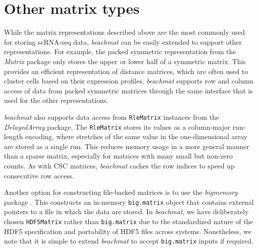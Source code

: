 \documentclass{article}
\newcommand{\beachmat}{\textit{beachmat}}
\newcommand{\code}[1]{\texttt{#1}}
\begin{document}
\section{Other matrix types}
While the matrix representations described above are the most commonly used for storing scRNA-seq data, \beachmat{} can be easily extended to support other representations.
For example, the packed symmetric representation from the \textit{Matrix} package only stores the upper or lower half of a symmetric matrix.
This provides an efficient representation of distance matrices, which are often used to cluster cells based on their expression profiles.
\beachmat{} supports row and column access of data from packed symmetric matrices through the same interface that is used for the other representations.

\beachmat{} also supports data access from \code{RleMatrix} instances from the \textit{DelayedArray} package.
The \code{RleMatrix} stores its values as a column-major run-length encoding, where stretches of the same value in the one-dimensional array are stored as a single run.
This reduces memory usage in a more general manner than a sparse matrix, especially for matrices with many small but non-zero counts.
As with CSC matrices, \beachmat{} caches the row indices to speed up consecutive row access.

Another option for constructing file-backed matrices is to use the \textit{bigmemory} package \cite{kane2013scalable}.
This constructs an in-memory \code{big.matrix} object that contains external pointers to a file in which the data are stored.
In \beachmat{}, we have deliberately chosen \code{HDF5Matrix} rather than \code{big.matrix} due to the standardized nature of the HDF5 specification and portability of HDF5 files across systems.
Nonetheless, we note that it is simple to extend \beachmat{} to accept \code{big.matrix} inputs if required.
\end{document}
